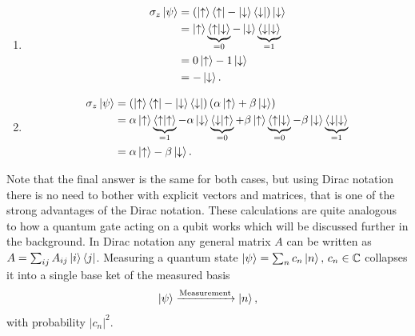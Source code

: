 \begin{enumerate}[label=\textbf{\alph*)}]
\item
\begin{equation}
\begin{aligned}
\sigma_z \ket{\psi} &= (\ket{\uparrow}\bra{\uparrow} - \ket{\downarrow}\bra{\downarrow})\ket{\downarrow} \\&= \ket{\uparrow}\underbrace{\bra{\uparrow}\ket{\downarrow}}_{ = 0} - \ket{\downarrow}\underbrace{\bra{\downarrow}\ket{\downarrow}}_{ = 1} \\&= 0\ket{\uparrow} - 1\ket{\downarrow} \\&= -\ket{\downarrow}.
\end{aligned}
\end{equation}
\item 
\begin{equation}
\begin{aligned}
\sigma_z \ket{\psi} &= \left( \ket{\uparrow}\bra{\uparrow} - \ket{\downarrow}\bra{\downarrow} \right) \left(\alpha\ket{\uparrow} + \beta\ket{\downarrow} \right) \\&= 
\alpha\ket{\uparrow}\underbrace{\bra{\uparrow}\ket{\uparrow}}_{ = 1} - \alpha\ket{\downarrow}\underbrace{\bra{\downarrow}\ket{\uparrow}}_{ = 0}
+
\beta\ket{\uparrow}\underbrace{\bra{\uparrow}\ket{\downarrow}}_{ = 0} - \beta\ket{\downarrow}\underbrace{\bra{\downarrow}\ket{\downarrow}}_{ = 1}\\&= \alpha\ket{\uparrow} - \beta\ket{\downarrow}.
\end{aligned}
\end{equation}
\end{enumerate}
Note that the final answer is the same for both cases, but using Dirac notation there is no need to bother with explicit vectors and matrices, that is one of the strong advantages of the Dirac notation. These calculations are quite analogous to how a quantum gate acting on a qubit works which will be discussed further in the background. In Dirac notation any general matrix $A$ can be written as $A = \sum_{ij} A_{ij}\ket{i}\bra{j}$. Measuring a quantum state $\ket{\psi} = \sum_{n}c_n\ket{n},\, c_n\in \mathbb{C}$ collapses it into a single base ket of the measured basis
\begin{equation}
\ket{\psi} \xrightarrow{\text{Measurement}} \ket{n},
\end{equation}
with probability $|c_n|^2$. 



